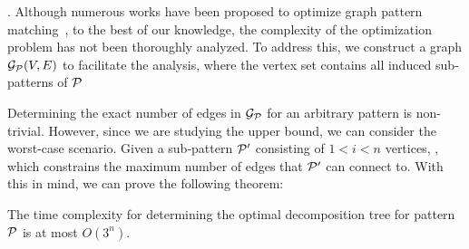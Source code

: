 . Although numerous works have been proposed to optimize graph pattern matching~\cite{huge,GLogS,mhedhbi2019optimizing}, to the best of our knowledge, the complexity of the optimization problem has not been thoroughly analyzed. To address this, we construct a graph $\mathcal{G}_{\mathcal{P}}(V, E)$ to facilitate the analysis, where the vertex set contains all induced sub-patterns of $\mathcal{P}$ 

Determining the exact number of edges in $\mathcal{G}_{\mathcal{P}}$ for an arbitrary pattern is non-trivial. However, since we are studying the upper bound, we can consider the worst-case scenario. Given a sub-pattern $\mathcal{P}'$ consisting of $1 < i < n$ vertices, , which constrains the maximum number of edges that $\mathcal{P}'$ can connect to. 
With this in mind, we can prove the following theorem:

\begin{theorem} \label{thm:complexity-of-graph-aware}
The time complexity for determining the optimal decomposition tree for pattern $\mathcal{P}$ is at most $O(3^n)$.
\end{theorem}

